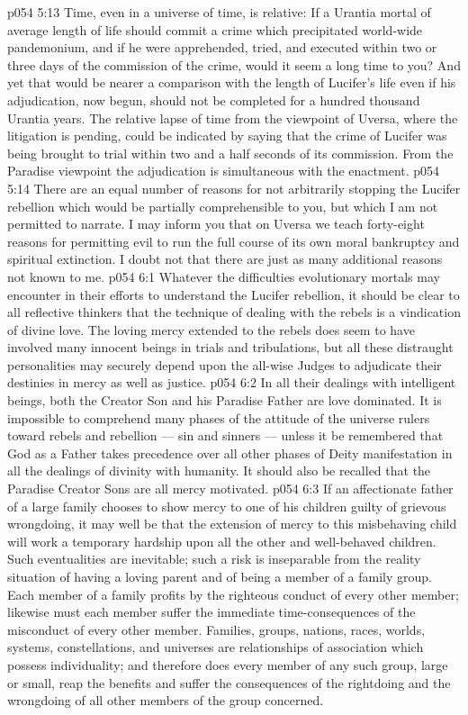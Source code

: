 \vs p054 5:13 \pc {}\bibnobreakspace Time, even in a universe of time, is relative: If a Urantia mortal of average length of life should commit a crime which precipitated world\hyp{}wide pandemonium, and if he were apprehended, tried, and executed within two or three days of the commission of the crime, would it seem a long time to you? And yet that would be nearer a comparison with the length of Lucifer’s life even if his adjudication, now begun, should not be completed for a hundred thousand Urantia years. The relative lapse of time from the viewpoint of Uversa, where the litigation is pending, could be indicated by saying that the crime of Lucifer was being brought to trial within two and a half seconds of its commission. From the Paradise viewpoint the adjudication is simultaneous with the enactment.
\vs p054 5:14 \pc There are an equal number of reasons for not arbitrarily stopping the Lucifer rebellion which would be partially comprehensible to you, but which I am not permitted to narrate. I may inform you that on Uversa we teach forty\hyp{}eight reasons for permitting evil to run the full course of its own moral bankruptcy and spiritual extinction. I doubt not that there are just as many additional reasons not known to me.
\vs p054 6:1 Whatever the difficulties evolutionary mortals may encounter in their efforts to understand the Lucifer rebellion, it should be clear to all reflective thinkers that the technique of dealing with the rebels is a vindication of divine love. The loving mercy extended to the rebels does seem to have involved many innocent beings in trials and tribulations, but all these distraught personalities may securely depend upon the all\hyp{}wise Judges to adjudicate their destinies in mercy as well as justice.
\vs p054 6:2 In all their dealings with intelligent beings, both the Creator Son and his Paradise Father are love dominated. It is impossible to comprehend many phases of the attitude of the universe rulers toward rebels and rebellion --- sin and sinners --- unless it be remembered that God as a Father takes precedence over all other phases of Deity manifestation in all the dealings of divinity with humanity. It should also be recalled that the Paradise Creator Sons are all mercy motivated.
\vs p054 6:3 \pc If an affectionate father of a large family chooses to show mercy to one of his children guilty of grievous wrongdoing, it may well be that the extension of mercy to this misbehaving child will work a temporary hardship upon all the other and well\hyp{}behaved children. Such eventualities are inevitable; such a risk is inseparable from the reality situation of having a loving parent and of being a member of a family group. Each member of a family profits by the righteous conduct of every other member; likewise must each member suffer the immediate time\hyp{}consequences of the misconduct of every other member. Families, groups, nations, races, worlds, systems, constellations, and universes are relationships of association which possess individuality; and therefore does every member of any such group, large or small, reap the benefits and suffer the consequences of the rightdoing and the wrongdoing of all other members of the group concerned.
